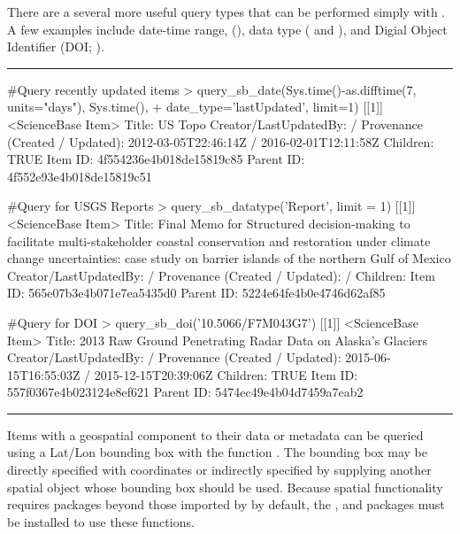 There are a several more useful query types that can be performed simply with . 
A few examples include date-time range, (), data type 
( and ), and Digial Object Identifier (DOI; ). 

\noindent\rule{\textwidth}{0.4pt}
\begin{example}
#Query recently updated items
> query_sb_date(Sys.time()-as.difftime(7, units="days"), Sys.time(),
+    date_type='lastUpdated', limit=1)
[[1]]
<ScienceBase Item>
  Title: US Topo
  Creator/LastUpdatedBy:      /
  Provenance (Created / Updated):  2012-03-05T22:46:14Z / 2016-02-01T12:11:58Z
  Children: TRUE
  Item ID: 4f554236e4b018de15819c85
  Parent ID: 4f552e93e4b018de15819c51


#Query for USGS Reports
> query_sb_datatype('Report', limit = 1)
[[1]]
<ScienceBase Item> 
  Title: Final Memo for Structured decision-making to facilitate multi-stakeholder 
  coastal conservation and restoration under climate change uncertainties: case study 
  on barrier islands of the northern Gulf of Mexico
  Creator/LastUpdatedBy:      / 
  Provenance (Created / Updated):   / 
  Children: 
  Item ID: 565e07b3e4b071e7ea5435d0
  Parent ID: 5224e64fe4b0e4746d62af85
  
#Query for DOI
> query_sb_doi('10.5066/F7M043G7')
[[1]]
<ScienceBase Item>
  Title: 2013 Raw Ground Penetrating Radar Data on Alaska's Glaciers
  Creator/LastUpdatedBy:      /
  Provenance (Created / Updated):  2015-06-15T16:55:03Z / 2015-12-15T20:39:06Z
  Children: TRUE
  Item ID: 557f0367e4b023124e8ef621
  Parent ID: 5474ec49e4b04d7459a7eab2
\end{example}
\noindent\rule{\textwidth}{0.4pt}


Items with a geospatial component to their data or metadata can be queried using a
Lat/Lon bounding box with the function . The
bounding box may be directly specified with coordinates or indirectly specified
by supplying another spatial object whose bounding box should be used. Because
spatial functionality requires packages beyond those imported by  by default,
the ,  and  packages must be installed to use these functions.

